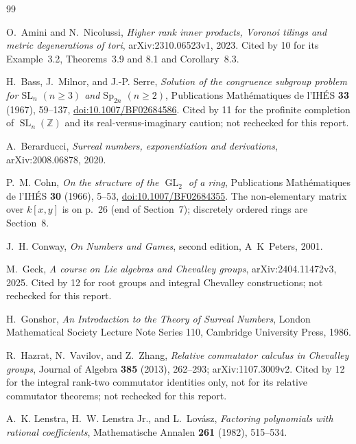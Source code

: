 \documentclass[11pt,oneside]{article}
\numberwithin{equation}{section}
\theoremstyle{definition}
\theoremstyle{remark}
\newcommand{\Z}{\mathbb Z}
\newcommand{\GL}{\operatorname{GL}}
\newcommand{\SL}{\operatorname{SL}}
\begin{document}
\clearpage
{}
{}
\begin{thebibliography}{99}
\small\raggedright
\setlength{\itemsep}{3pt}

O.~Amini and N.~Nicolussi, \emph{Higher rank inner products, Voronoi tilings and
metric degenerations of tori}, arXiv:2310.06523v1, 2023. Cited by 10 for its
Example~3.2, Theorems~3.9 and 8.1 and Corollary~8.3.

H.~Bass, J.~Milnor, and J.-P. Serre, \emph{Solution of the congruence subgroup
problem for $\mathrm{SL}_n$ $(n\ge3)$ and $\mathrm{Sp}_{2n}$ $(n\ge2)$},
Publications Math\'ematiques de l'IH\'ES \textbf{33} (1967), 59--137,
\href{https://doi.org/10.1007/BF02684586}{doi:10.1007/BF02684586}. Cited by 11
for the profinite completion of $\SL_n(\Z)$ and its real-versus-imaginary
caution; not rechecked for this report.

A.~Berarducci, \emph{Surreal numbers, exponentiation and derivations},
arXiv:2008.06878, 2020.

P.~M. Cohn, \emph{On the structure of the $\GL_2$ of a ring}, Publications
Math\'ematiques de l'IH\'ES \textbf{30} (1966), 5--53,
\href{https://doi.org/10.1007/BF02684355}{doi:10.1007/BF02684355}. The
non-elementary matrix over $k[x,y]$ is on p.~26 (end of Section~7); discretely
ordered rings are Section~8.

J.~H. Conway, \emph{On Numbers and Games}, second edition, A~K~Peters, 2001.

M.~Geck, \emph{A course on Lie algebras and Chevalley groups},
arXiv:2404.11472v3, 2025. Cited by 12 for root groups and integral Chevalley
constructions; not rechecked for this report.

H.~Gonshor, \emph{An Introduction to the Theory of Surreal Numbers}, London
Mathematical Society Lecture Note Series 110, Cambridge University Press, 1986.

R.~Hazrat, N.~Vavilov, and Z.~Zhang, \emph{Relative commutator calculus in
Chevalley groups}, Journal of Algebra \textbf{385} (2013), 262--293;
arXiv:1107.3009v2. Cited by 12 for the integral rank-two commutator identities
only, not for its relative commutator theorems; not rechecked for this report.

A.~K. Lenstra, H.~W. Lenstra Jr., and L.~Lov\'asz, \emph{Factoring polynomials
with rational coefficients}, Mathematische Annalen \textbf{261} (1982), 515--534.


\end{thebibliography}
\end{document}
